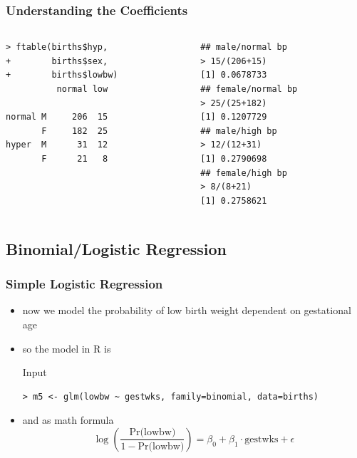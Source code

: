 \begin{frame}[fragile]\frametitle{Understanding the Coefficients}
    \begin{columns}\small
      \begin{column}{0.5\textwidth}
\begin{verbatim}
> ftable(births$hyp,
+        births$sex,
+        births$lowbw)
          normal low
                    
normal M     206  15
       F     182  25
hyper  M      31  12
       F      21   8
\end{verbatim}
      \end{column}
      \begin{column}{0.5\textwidth}
\begin{verbatim}
## male/normal bp
> 15/(206+15)
[1] 0.0678733
## female/normal bp
> 25/(25+182)
[1] 0.1207729
## male/high bp
> 12/(12+31)
[1] 0.2790698
## female/high bp
> 8/(8+21)
[1] 0.2758621
\end{verbatim}
      \end{column}
    \end{columns}
\end{frame}

\subsection{Binomial/Logistic Regression}

\begin{frame}[fragile]\frametitle{Simple Logistic Regression}
\begin{itemize}
\item now we model the probability of low birth weight dependent on gestational age
\item so the model in R is 
  \begin{exampleblock}{Input}\footnotesize
\begin{verbatim}
> m5 <- glm(lowbw ~ gestwks, family=binomial, data=births)
\end{verbatim}
  \end{exampleblock}\normalsize
\item and as math formula
$$ \log\left(\frac{\mbox{Pr(lowbw)}}{1-\mbox{Pr(lowbw)}}\right) = \beta_0 + \beta_1 \cdot \mbox{gestwks} + \epsilon$$
\end{itemize}
\end{frame}


